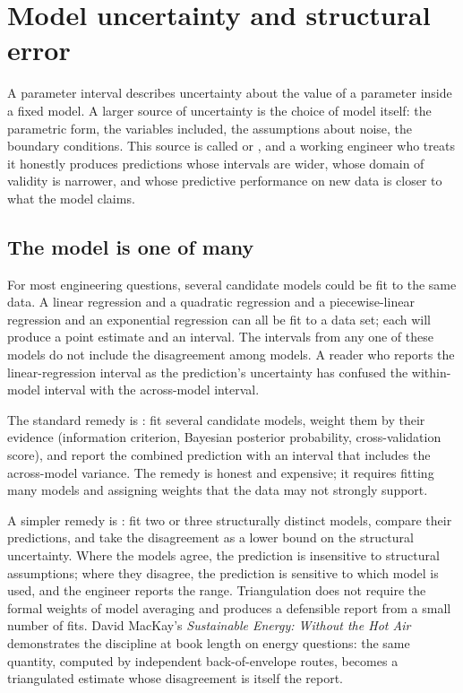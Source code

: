 \section{Model uncertainty and structural error}

A parameter interval describes uncertainty about the value of a
parameter inside a fixed model. A larger source of uncertainty is
the choice of model itself: the parametric form, the variables
included, the assumptions about noise, the boundary conditions.
This source is called  or
, and a working engineer who treats it
honestly produces predictions whose intervals are wider, whose
domain of validity is narrower, and whose predictive performance
on new data is closer to what the model claims.

\subsection{The model is one of many}

For most engineering questions, several candidate models could be
fit to the same data. A linear regression and a quadratic
regression and a piecewise-linear regression and an exponential
regression can all be fit to a data set; each will produce a
point estimate and an interval. The intervals from any one of
these models do not include the disagreement among models. A
reader who reports the linear-regression interval as the
prediction's uncertainty has confused the within-model interval
with the across-model interval.

The standard remedy is : fit several
candidate models, weight them by their evidence (information
criterion, Bayesian posterior probability, cross-validation
score), and report the combined prediction with an interval that
includes the across-model variance. The remedy is honest and
expensive; it requires fitting many models and assigning weights
that the data may not strongly support.

A simpler remedy is : fit two or
three structurally distinct models, compare their predictions,
and take the disagreement as a lower bound on the structural
uncertainty. Where the models agree, the prediction is insensitive to
structural assumptions; where they disagree, the prediction is
sensitive to which model is used, and the engineer reports the
range. Triangulation does not require the formal weights of model
averaging and produces a defensible report from a small number of
fits. David MacKay's \emph{Sustainable Energy: Without the Hot Air}
\cite{gen:mackay2009} demonstrates the discipline at book length on
energy questions: the same quantity, computed by independent
back-of-envelope routes, becomes a triangulated estimate whose
disagreement is itself the report.

